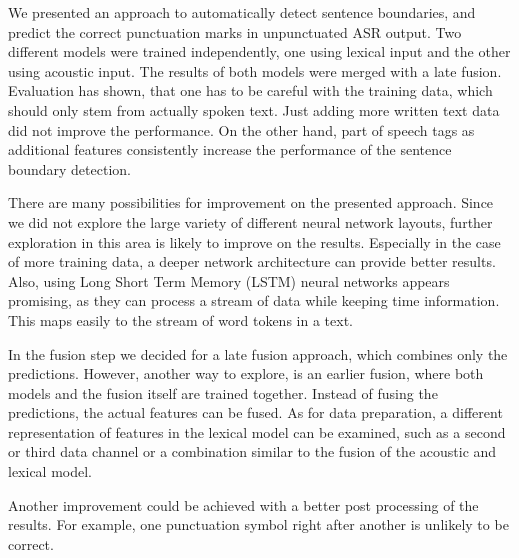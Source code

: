 We presented an approach to automatically detect sentence boundaries, and predict the correct punctuation marks in unpunctuated ASR output.
Two different models were trained independently, one using lexical input and the other using acoustic input.
The results of both models were merged with a late fusion.
Evaluation has shown, that one has to be careful with the training data, which should only stem from actually spoken text.
Just adding more written text data did not improve the performance.
On the other hand, part of speech tags as additional features consistently increase the performance of the sentence boundary detection.

There are many possibilities for improvement on the presented approach.
Since we did not explore the large variety of different neural network layouts, further exploration in this area is likely to improve on the results.
Especially in the case of more training data, a deeper network architecture can provide better results.
Also, using Long Short Term Memory (LSTM) neural networks appears promising, as they can process a stream of data while keeping time information.
This maps easily to the stream of word tokens in a text.

In the fusion step we decided for a late fusion approach, which combines only the predictions.
However, another way to explore, is an earlier fusion, where both models and the fusion itself are trained together.
Instead of fusing the predictions, the actual features can be fused.
As for data preparation, a different representation of features in the lexical model can be examined, such as a second or third data channel or a combination similar to the fusion of the acoustic and lexical model.

Another improvement could be achieved with a better post processing of the results.
For example, one punctuation symbol right after another is unlikely to be correct.
